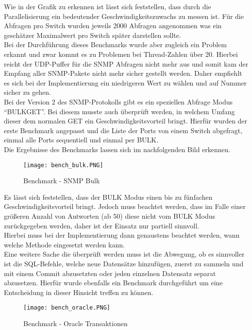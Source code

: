 Wie in der Grafik zu erkennen ist lässt sich feststellen, dass durch die Parallelisierung ein bedeutender Geschwindigkeitszuwachs zu messen ist.
Für die Abfragen pro Switch wurden jeweils 2000 Abfragen angenommen was ein geschätzer Maximalwert pro Switch später darstellen sollte.\\
Bei der Durchführung dieses Benchmarks wurde aber zugleich ein Problem erkannt und zwar kommt es zu Problemen bei Thread-Zahlen über 20. Hierbei reicht der UDP-Puffer für die SNMP Abfragen nicht mehr aus und somit kam der Empfang aller SNMP-Pakete nicht mehr sicher gestellt werden. Daher empfiehlt es sich bei der Implementierung ein niedrigeren Wert zu wählen und auf Nummer sicher zu gehen.\\
Bei der Version 2 des SNMP-Protokolls gibt es ein speziellen Abfrage Modus “BULKGET”. Bei diesem musste auch überprüft werden, in welchem Umfang dieser dem normalen GET ein Geschwindigkeitsvorteil bringt. Hierfür wurden der erste Benchmark angepasst und die Liste der Ports von einem Switch abgefragt, einmal alle Ports sequentiell und einmal per BULK.\\
Die Ergebnisse des Benchmarks lassen sich im nachfolgenden Bild erkennen.\\

\begin{figure}[H]
\centering
\texttt{[image: bench\_bulk.PNG]}
\caption{Benchmark - SNMP Bulk}
\label{fig:benchsnmpbulk}
\end{figure}

Es lässt sich feststellen, dass der BULK Modus einen bis zu fünfachen Geschwindigkeitsvorteil bringt. Jedoch muss beachtet werden, dass im Falle einer größeren Anzahl von Antworten (ab 50) diese nicht vom BULK Modus zurückgegeben werden, daher ist der Einsatz nur partiell sinnvoll.\\
Hierbei muss bei der Implementierung dann genaustens beachtet werden, wann welche Methode eingesetzt werden kann.\\

Eine weitere Sache die überprüft werden muss ist die Abwegung, ob es sinnvoller ist die SQL-Befehle, welche neue Datensätze hinzufügen, zuerst zu sammeln und mit einem Commit abzusetzten oder jeden einzelnen Datensatz separat abzusetzen. Hierfür wurde ebenfalls ein Benchmark durchgeführt um eine Entscheidung in dieser Hinsicht treffen zu können.\\

\begin{figure}[H]
\centering
\texttt{[image: bench\_oracle.PNG]}
\caption{Benchmark - Oracle Transaktionen}
\label{fig:benchoracletransactions}
\end{figure}


